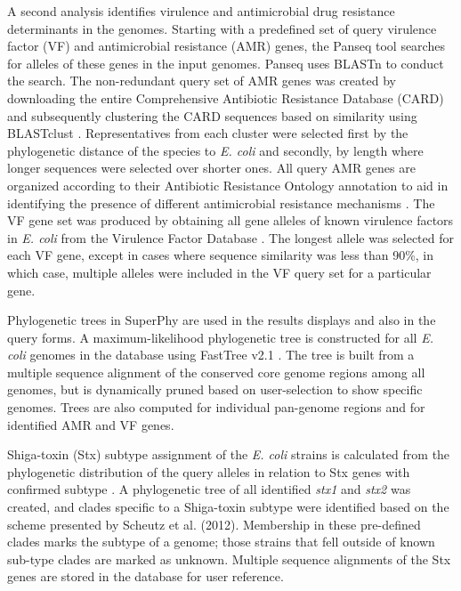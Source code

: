 \documentclass[a4paper,twoside]{article}
\begin{document}
A second analysis identifies virulence and antimicrobial drug resistance determinants in the genomes. Starting with a predefined set of query virulence factor (VF) and antimicrobial resistance (AMR) genes, the Panseq tool searches for alleles of these genes in the input genomes. Panseq uses BLASTn to conduct the search. The non-redundant query set of AMR genes was created by downloading the entire Comprehensive Antibiotic Resistance Database (CARD) \cite{mcarthur2012card} and subsequently clustering the CARD sequences based on similarity using BLASTclust \cite{altschul_gapped_1997}. Representatives from each cluster were selected first by the phylogenetic distance of the species to \textit{E. coli} and secondly, by length where longer sequences were selected over shorter ones. All query AMR genes are organized according to their Antibiotic Resistance Ontology annotation to aid in identifying the presence of different antimicrobial resistance mechanisms \cite{antezana_biological_2009}. The VF gene set was produced by obtaining all gene alleles of known virulence factors in \textit{E. coli} from the Virulence Factor Database \cite{chen2012vfdb,chen2005vfdb}.  The longest allele was selected for each VF gene, except in cases where sequence similarity was less than 90\%, in which case, multiple alleles were included in the VF query set for a particular gene.

Phylogenetic trees in SuperPhy are used in the results displays and also in the query forms. A maximum-likelihood phylogenetic tree is constructed for all \textit{E. coli} genomes in the database using FastTree v2.1 \cite{price_fasttree_2010}. The tree is built from a multiple sequence alignment of the conserved core genome regions among all genomes, but is dynamically pruned based on user-selection to show specific genomes. Trees are also computed for individual pan-genome regions and for identified AMR and VF genes.

Shiga-toxin (Stx) subtype assignment of the \textit{E. coli} strains is calculated from the phylogenetic distribution of the query alleles in relation to Stx genes with confirmed subtype \cite{scheutz_multicenter_2012}. A phylogenetic tree of all identified \textit{stx1} and \textit{stx2} was created, and clades specific to a Shiga-toxin subtype were identified based on the scheme presented by Scheutz et al. (2012). Membership in these pre-defined clades marks the subtype of a genome; those strains that fell outside of known sub-type clades are marked as unknown. Multiple sequence alignments of the Stx genes are stored in the database for user reference.
\end{document}
